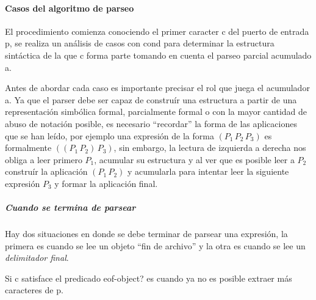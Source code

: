 \documentclass[letterpaper, twoside, openright, 11pt]{book}%
\begin{document}
\paragraph{Casos del algoritmo de parseo} El procedimiento {\Tt{}\nwendquote} comienza conociendo el primer caracter {\Tt{}c\nwendquote} del puerto de entrada {\Tt{}p\nwendquote}, se realiza un análisis de casos con {\Tt{}cond\nwendquote} para determinar la estructura sintáctica de la que {\Tt{}c\nwendquote} forma parte tomando en cuenta el parseo parcial acumulado {\Tt{}a\nwendquote}.

Antes de abordar cada caso es importante precisar el rol que juega el acumulador {\Tt{}a\nwendquote}. Ya que el parser debe ser capaz de construír una estructura a partir de una representación simbólica formal, parcialmente formal o con la mayor cantidad de abuso de notación posible, es necesario ``recordar'' la forma de las aplicaciones que se han leído, por ejemplo una expresión de la forma \( (P_{1}\, P_{2}\, P_{3}) \) es formalmente \( ((P_{1}\, P_{2})\, P_{3}) \), sin embargo, la lectura de izquierda a derecha nos obliga a leer primero \( P_{1} \), acumular su estructura y al ver que es posible leer a \( P_{2} \) construír la aplicación \( (P_{1}\, P_{2}) \) y acumularla para intentar leer la siguiente expresión \( P_{3} \) y formar la aplicación final.

\subparagraph{Cuando se termina de parsear} Hay dos situaciones en donde se debe terminar de parsear una expresión, la primera es cuando se lee un objeto ``fin de archivo'' y la otra es cuando se lee un \emph{delimitador final}.

Si {\Tt{}c\nwendquote} satisface el predicado {\Tt{}eof-object?\nwendquote} es cuando ya no es posible extraer más caracteres de {\Tt{}p\nwendquote}.

\nwenddocs{}\endmoddef\nwstartdeflinemarkup{}
\nwendcode{}\nwdocspar
\end{document}
